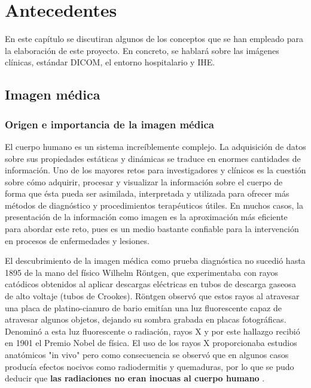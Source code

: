 \chapter{Antecedentes}
\label{chap:antecedentes}

En este capítulo se discutiran algunos de los conceptos que se han empleado para la elaboración de este proyecto. En concreto, se hablará sobre las imágenes clínicas, estándar \acs{DICOM}, el entorno hospitalario y \acs{IHE}.

\section{Imagen médica}

\subsection{Origen e importancia de la imagen médica}

El cuerpo humano es un sistema increíblemente complejo. La adquisición de datos sobre sus propiedades estáticas y dinámicas se traduce en enormes cantidades de información. Uno de los mayores retos para investigadores y clínicos es la cuestión sobre cómo adquirir, procesar y visualizar la información sobre el cuerpo de forma que ésta pueda ser asimilada, interpretada y utilizada para ofrecer más métodos de diagnóstico y procedimientos terapéuticos útiles. En muchos casos, la presentación de la información como imagen es la aproximación más eficiente para abordar este reto, pues es un medio bastante confiable para la intervención en procesos de enfermedades y lesiones\cite{3}.

El descubrimiento de la imagen médica como prueba diagnóstica no sucedió hasta 1895 de la mano del físico Wilhelm Röntgen, que experimentaba con rayos catódicos obtenidos al aplicar descargas eléctricas en tubos de descarga gaseosa de alto voltaje (tubos de Crookes). Röntgen observó que estos rayos al atravesar una placa de platino-cianuro de bario emitían una luz fluorescente capaz de atravesar algunos objetos, dejando su sombra grabada en placas fotográficas. Denominó a esta luz fluorescente o radiación, rayos X y por este hallazgo recibió en 1901 el Premio Nobel de física. El uso de los rayos X proporcionaba estudios anatómicos "in vivo" pero como consecuencia se observó que en algunos casos producía efectos nocivos como radiodermitis y quemaduras, por lo que se pudo deducir que \textbf{las radiaciones no eran inocuas al cuerpo humano} \cite{4}.


